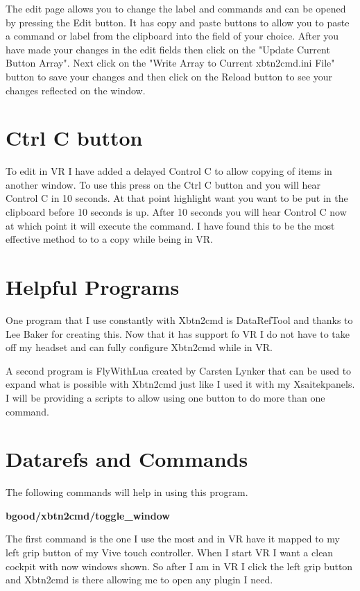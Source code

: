 \documentclass[11pt,parskip=half,a4paper]{scrartcl}
\begin{document}
The edit page allows you to change the label and commands and can be opened by pressing the Edit button. It has copy and paste buttons to allow you to paste a command or label from the clipboard into the field of your choice. After you have made your changes in the edit fields then click on the "Update Current Button Array". Next click on the "Write Array to Current xbtn2cmd.ini File" button to save your changes and then click on the Reload button to see your changes reflected on the window. 

\newpage
\section{Ctrl C button}

To edit in VR I have added a delayed Control C to allow copying of items in another window. To use this press on the Ctrl C button and you will hear Control C in 10 seconds. At that point highlight want you want to be put in the clipboard before 10 seconds is up. After 10 seconds you will hear Control C now at which point it will execute the command. I have found this to be the most effective method to to a copy while being in VR.

\newpage
\section{Helpful Programs}

One program that I use constantly with Xbtn2cmd is DataRefTool and thanks to Lee Baker for creating this. Now that it has support fo VR I do not have to take off my headset and can fully configure Xbtn2cmd while in VR.

A second program is FlyWithLua created by Carsten Lynker that can be used to expand what is possible with Xbtn2cmd just like I used it with my Xsaitekpanels. I will be providing a scripts to allow using one button to do more than one command.

\newpage
\section{Datarefs and Commands}

The following commands will help in using this program.

{\bf bgood/xbtn2cmd/toggle\_window}

The first command is the one I use the most and in VR have it mapped to my left grip button of my Vive touch controller. When I start VR I want a clean cockpit with now windows shown. So after I am in VR I click the left grip button and Xbtn2cmd is there allowing me to open any plugin I need.
\end{document}
